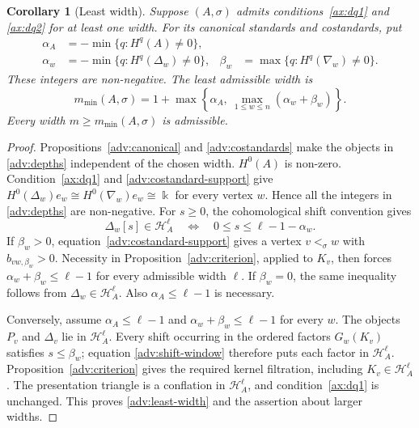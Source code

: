 \documentclass[11pt,a4paper]{article}
\renewcommand{\H}{\mathcal H}
\newcommand{\std}{\Delta}
\newcommand{\costd}{\nabla}
\theoremstyle{plain}
\newtheorem{corollary}[theorem]{Corollary}
\theoremstyle{definition}
\numberwithin{equation}{section}
\begin{document}
\begin{corollary}[Least width]\label{adv:width}
Suppose $(A,\sigma)$ admits conditions~\ref{ax:dq1} and
\ref{ax:dq2} for at least one width. For its canonical standards and
costandards, put
\begin{equation}\label{adv:depths}
 \begin{aligned}
 \alpha_A&=-\min\{q:H^q(A)\neq0\},\\
 \alpha_w&=-\min\{q:H^q(\std_w)\neq0\},
 &\beta_w&=\max\{q:H^q(\costd_w)\neq0\}.
 \end{aligned}
\end{equation}
These integers are non-negative. The least admissible width is
\begin{equation}\label{adv:least-width}
 m_{\min}(A,\sigma)=
 1+\max\left\{\alpha_A,\
             \max_{1\leq w\leq n}(\alpha_w+\beta_w)\right\}.
\end{equation}
Every width $m\geq m_{\min}(A,\sigma)$ is admissible.
\end{corollary}
\begin{proof}
Propositions~\ref{adv:canonical} and \ref{adv:costandards} make the
objects in \eqref{adv:depths} independent of the chosen width.
$H^0(A)$ is non-zero. Condition~\ref{ax:dq1} and
\eqref{adv:costandard-support} give
$H^0(\std_w)e_w\cong H^0(\costd_w)e_w\cong\Bbbk$ for every
vertex $w$. Hence all the integers
in \eqref{adv:depths} are non-negative.
For $s\geq0$, the cohomological shift convention gives
\begin{equation}\label{adv:shift-window}
 \std_w[s]\in\H_A^\ell
 \quad\Longleftrightarrow\quad
 0\leq s\leq\ell-1-\alpha_w.
\end{equation}
If $\beta_w>0$, equation~\eqref{adv:costandard-support} gives a
vertex $v<_\sigma w$ with $b_{vw,\beta_w}>0$.
Necessity in Proposition~\ref{adv:criterion}, applied to $K_v$,
then forces $\alpha_w+\beta_w\leq\ell-1$ for every admissible width
$\ell$. If $\beta_w=0$, the same inequality follows from
$\std_w\in\H_A^\ell$. Also $\alpha_A\leq\ell-1$ is necessary.

Conversely, assume $\alpha_A\leq\ell-1$ and
$\alpha_w+\beta_w\leq\ell-1$ for every $w$. The objects $P_v$ and
$\std_v$ lie in $\H_A^\ell$. Every shift occurring in the ordered
factors $G_w(K_v)$ satisfies $s\leq\beta_w$; equation
\eqref{adv:shift-window} therefore puts each factor in $\H_A^\ell$.
Proposition~\ref{adv:criterion} gives the required kernel filtration,
including $K_v\in\H_A^\ell$.
The presentation triangle is a conflation in $\H_A^\ell$, and
condition~\ref{ax:dq1} is unchanged. This proves
\eqref{adv:least-width} and the assertion about larger widths.
\end{proof}
\end{document}
